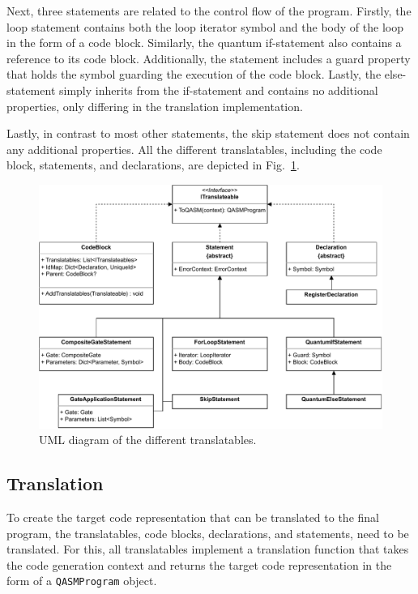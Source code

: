 Next, three statements are related to the control flow of the program. Firstly, the loop statement contains both the loop iterator symbol and the body of the loop in the form of a code block. Similarly, the quantum if-statement also contains a reference to its code block. Additionally, the statement includes a guard property that holds the symbol guarding the execution of the code block. Lastly, the else-statement simply inherits from the if-statement and contains no additional properties, only differing in the translation implementation.

Lastly, in contrast to most other statements, the skip statement does not contain any additional properties. All the different translatables, including the code block, statements, and declarations, are depicted in Fig.~\ref{fig:implementation_uml_translatables}. 

\begin{figure}[htp]
    \centering
    \includegraphics[width=.9\textwidth]{../figures/drawio/uml_translateables.pdf}
    \caption{UML diagram of the different translatables.}
    \label{fig:implementation_uml_translatables}
\end{figure}

\subsection{Translation}
\label{sec:implementation_translation}
To create the target code representation that can be translated to the final program, the translatables, \ie code blocks, declarations, and statements, need to be translated. For this, all translatables implement a translation function that takes the code generation context and returns the target code representation in the form of a \texttt{QASMProgram} object.

